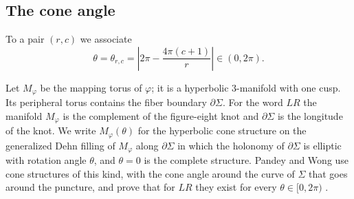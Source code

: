 \documentclass[11pt]{amsart}
\theoremstyle{definition}
\theoremstyle{remark}
\begin{document}
\subsection{The cone angle}
To a pair $(r,c)$ we associate
\begin{equation}\label{eq:theta}
\theta = \theta_{r,c} = \left| 2\pi - \frac{4\pi (c+1)}{r} \right| \in (0, 2\pi).
\end{equation}

Let $M_\varphi$ be the mapping torus of $\varphi$; it is a hyperbolic $3$-manifold
with one cusp. Its peripheral torus contains the fiber boundary $\partial\Sigma$.
For the word $LR$ the manifold $M_\varphi$ is the complement of the figure-eight knot
\cite{PW} and $\partial\Sigma$ is the longitude of the knot. We write $M_\varphi(\theta)$
for the hyperbolic cone structure on the generalized Dehn filling of $M_\varphi$ along
$\partial\Sigma$ in which the holonomy of $\partial\Sigma$ is elliptic with rotation
angle $\theta$, and $\theta = 0$ is the complete structure. Pandey and Wong
\cite{PW} use cone structures of this kind, with the cone angle around the curve of
$\Sigma$ that goes around the puncture, and prove that for $LR$ they exist for every
$\theta \in [0, 2\pi)$ \cite[Lemma~4.1]{PW}.
\end{document}
